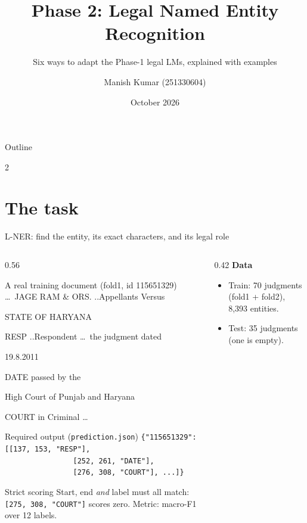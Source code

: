 \documentclass[aspectratio=169,11pt]{beamer}
\title[CS-781 Phase 2: Legal NER]{Phase 2: Legal Named Entity Recognition}
\subtitle{Six ways to adapt the Phase-1 legal LMs, explained with examples}
\author[Manish Kumar]{Manish Kumar (251330604)}
\institute{CS-781, IIT Kanpur}
\date{October 2026}
\newcommand{\code}[1]{\texttt{\small #1}}
\newcommand{\ent}[2]{\colorbox{#1!18}{\strut #2}}
\newcommand{\tg}[1]{{\scriptsize\color{warm}#1}}
\begin{document}
\begin{frame}
  \titlepage
\end{frame}

\begin{frame}{Outline}
  \begin{multicols}{2}
  \tableofcontents
  \end{multicols}
\end{frame}

\section{The task}

\begin{frame}{L-NER: find the entity, its exact characters, and its legal role}
  \begin{columns}[T]
    \begin{column}{0.56\textwidth}
      \scriptsize
      \begin{exampleblock}{A real training document (fold1, id 115651329)}
        \ldots\ JAGE RAM \& ORS. ..Appellants Versus
        \ent{warm}{STATE OF HARYANA}\tg{RESP} ..Respondent
        \ldots\ the judgment dated \ent{aqua}{19.8.2011}\tg{DATE} passed by the
        \ent{accent}{High Court of Punjab and Haryana}\tg{COURT} in Criminal \ldots
      \end{exampleblock}
      \begin{block}{Required output (\code{prediction.json})}
        \code{\{"115651329": [[137, 153, "RESP"],}\\
        \code{\ \ \ \ \ \ \ \ \ \ \ \ \ \ \ \ [252, 261, "DATE"],}\\
        \code{\ \ \ \ \ \ \ \ \ \ \ \ \ \ \ \ [276, 308, "COURT"], ...]\}}
      \end{block}
      \begin{alertblock}{Strict scoring}
        Start, end \emph{and} label must all match:
        \code{[275, 308, "COURT"]} scores zero. Metric: macro-F1 over 12 labels.
      \end{alertblock}
    \end{column}
    \begin{column}{0.42\textwidth}
      \footnotesize
      \textbf{Data}
      \begin{itemize}
        \item Train: 70 judgments (fold1 + fold2), 8{,}393 entities.
        \item Test: 35 judgments (one is empty).

\end{itemize}
\end{column}
\end{columns}
\end{frame}
\end{document}
